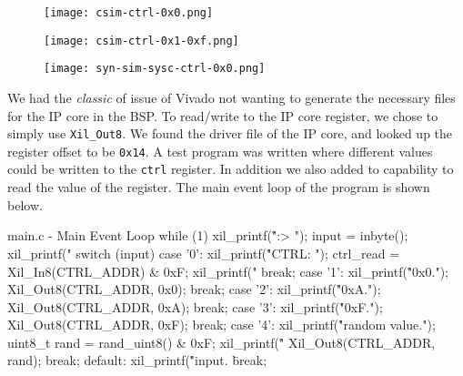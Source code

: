 \documentclass[../main.tex]{subfiles}
\begin{document}
\begin{figure}[h]
    \centering
    \texttt{[image: csim-ctrl-0x0.png]}
\end{figure}

\begin{figure}[h]
    \centering
    \texttt{[image: csim-ctrl-0x1-0xf.png]}
\end{figure}

\begin{figure}[h]
    \centering
    \texttt{[image: syn-sim-sysc-ctrl-0x0.png]}
\end{figure}

\newpage

We had the \textit{classic} of issue of Vivado not wanting to generate the necessary files for the IP core in the BSP. To read/write to the IP core register, we chose to simply use \texttt{Xil\_Out8}. We found the driver file of the IP core, and looked up the register offset to be \texttt{0x14}. A test program was written where different values could be written to the \texttt{ctrl} register. In addition we also added to capability to read the value of the register. The main event loop of the program is shown below.

\begin{myminted}{main.c - Main Event Loop}
while (1)
{
    xil_printf("\r\n\nCMD:> ");
    input = inbyte();
    xil_printf("%
    switch (input)
    {
        case '0':
            xil_printf("\r\nReading CTRL: ");
            ctrl_read = Xil_In8(CTRL_ADDR) & 0xF;
            xil_printf("%
            break;
        case '1':
            xil_printf("\r\nWriting 0x0.");
            Xil_Out8(CTRL_ADDR, 0x0);
            break;
        case '2':
            xil_printf("\r\nWriting 0xA.");
            Xil_Out8(CTRL_ADDR, 0xA);
            break;
        case '3':
            xil_printf("\r\nWriting 0xF.");
            Xil_Out8(CTRL_ADDR, 0xF);
            break;
        case '4':
            xil_printf("\r\nGenerating random value.");
            uint8_t rand = rand_uint8() & 0xF;
            xil_printf("\r\nWriting %
            Xil_Out8(CTRL_ADDR, rand);
            break;
        default:
            xil_printf("\r\nUnrecognized input. \"%
            break;
    }
}
\end{myminted}
\end{document}
